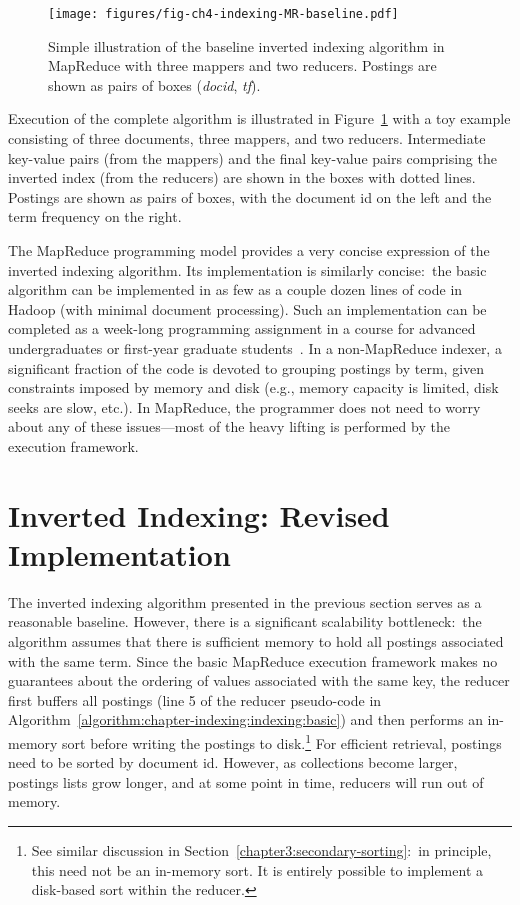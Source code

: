 \begin{figure}[t]
\begin{center}
\texttt{[image: figures/fig-ch4-indexing-MR-baseline.pdf]}
\end{center}
\caption{Simple illustration of the baseline inverted indexing
  algorithm in MapReduce with three mappers and two reducers.
  Postings are shown as pairs of boxes (\emph{docid}, \emph{tf}).}
\label{chapter-indexing:MR-baseline}
\end{figure}

Execution of the complete algorithm is illustrated in
Figure~\ref{chapter-indexing:MR-baseline} with a toy example
consisting of three documents, three mappers, and two reducers.
Intermediate key-value pairs (from the mappers) and the final
key-value pairs comprising the inverted index (from the reducers) are
shown in the boxes with dotted lines.  Postings are shown as pairs of
boxes, with the document id on the left and the term frequency on the
right.

The MapReduce programming model provides a very concise expression of
the inverted indexing algorithm.  Its implementation is similarly
concise:\ the basic algorithm can be implemented in as few as a couple
dozen lines of code in Hadoop (with minimal document processing).
Such an implementation can be completed as a week-long programming
assignment in a course for advanced undergraduates or first-year
graduate students~\cite{KimballA_etal_2008,Lin_TeachCL2008}.  In a
non-MapReduce indexer, a significant fraction of the code is devoted
to grouping postings by term, given constraints imposed by memory and
disk (e.g., memory capacity is limited, disk seeks are slow, etc.).
In MapReduce, the programmer does not need to worry about any of these
issues---most of the heavy lifting is performed by the execution
framework.

\section{Inverted Indexing: Revised Implementation}
\label{chapter-indexing:index:revised}

The inverted indexing algorithm presented in the previous section
serves as a reasonable baseline.  However, there is a significant
scalability bottleneck:\ the algorithm assumes that there is
sufficient memory to hold all postings associated with the same term.
Since the basic MapReduce execution framework makes no guarantees
about the ordering of values associated with the same key, the reducer
first buffers all postings (line 5 of the reducer pseudo-code in
Algorithm~\ref{algorithm:chapter-indexing:indexing:basic}) and then performs an
in-memory sort before writing the postings to disk.\footnote{See
  similar discussion in Section~\ref{chapter3:secondary-sorting}:\ in
  principle, this need not be an in-memory sort.  It is entirely
  possible to implement a disk-based sort within the reducer.}  For
efficient retrieval, postings need to be sorted by document id.
However, as collections become larger, postings lists grow longer, and
at some point in time, reducers will run out of memory.

